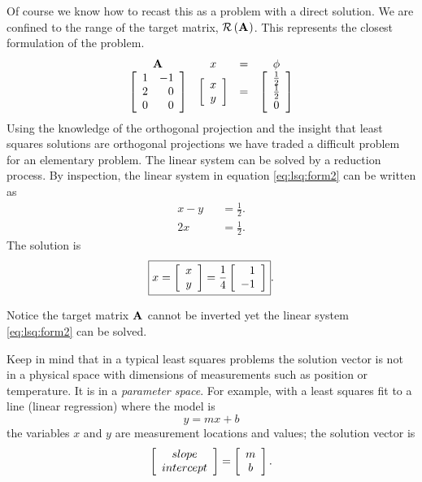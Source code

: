 Of course we know how to recast this as a problem with a direct solution. We are confined to the range of the target matrix, $\rng{\A{}}$. This represents the closest formulation of the problem.
\begin{equation}
  \begin{array}{cccc}
    \A{} & x & = & \phi \\
    \mat{cr}{1&-1\\2&0\\0&0} & \mat{c}{x\\y} & = & \mat{c}{\frac{1}{2}\\\frac{1}{2}\\0}
  \end{array}
  \label{eq:lsq:form2}
\end{equation}
Using the knowledge of the orthogonal projection and the insight that least squares solutions are orthogonal projections we have traded a difficult problem for an elementary problem. The linear system can be solved by a reduction process. By inspection, the linear system in equation \eqref{eq:lsq:form2} can be written as
\begin{equation}
  \begin{split}
    x-y&=\frac{1}{2}.\\
    2x\qquad&=\frac{1}{2}.
  \end{split}
\end{equation}
The solution is
\begin{equation}
\boxed{
  x = \mat{c}{x\\y}=\frac{1}{4}\mat{r}{1\\-1}
  }.
\end{equation}

Notice the target matrix $\A{}$ cannot be inverted yet the linear system \eqref{eq:lsq:form2} can be solved.

Keep in mind that in a typical least squares problems the solution vector is not in a physical space with dimensions of measurements such as position or temperature. It is in a \textit{parameter space}. For example, with a least squares fit to a line (linear regression) where the model is
\begin{equation}
  y = m x + b
\end{equation}
the variables $x$ and $y$ are measurement locations and values; the solution vector is
\begin{equation}
  \mat{c}{slope\\intercept}=\mat{c}{m\\b}.
\end{equation}

